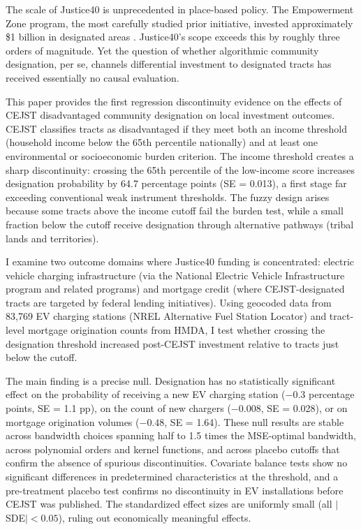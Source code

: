 \documentclass[12pt]{article}
\begin{document}
The scale of Justice40 is unprecedented in place-based policy. The Empowerment Zone program, the most carefully studied prior initiative, invested approximately \$1 billion in designated areas \citep{busso2013assessing}. Justice40's scope exceeds this by roughly three orders of magnitude. Yet the question of whether algorithmic community designation, per se, channels differential investment to designated tracts has received essentially no causal evaluation.

This paper provides the first regression discontinuity evidence on the effects of CEJST disadvantaged community designation on local investment outcomes. CEJST classifies tracts as disadvantaged if they meet both an income threshold (household income below the 65th percentile nationally) and at least one environmental or socioeconomic burden criterion. The income threshold creates a sharp discontinuity: crossing the 65th percentile of the low-income score increases designation probability by 64.7 percentage points (SE = 0.013), a first stage far exceeding conventional weak instrument thresholds. The fuzzy design arises because some tracts above the income cutoff fail the burden test, while a small fraction below the cutoff receive designation through alternative pathways (tribal lands and territories).

I examine two outcome domains where Justice40 funding is concentrated: electric vehicle charging infrastructure (via the National Electric Vehicle Infrastructure program and related programs) and mortgage credit (where CEJST-designated tracts are targeted by federal lending initiatives). Using geocoded data from 83,769 EV charging stations (NREL Alternative Fuel Station Locator) and tract-level mortgage origination counts from HMDA, I test whether crossing the designation threshold increased post-CEJST investment relative to tracts just below the cutoff.

The main finding is a precise null. Designation has no statistically significant effect on the probability of receiving a new EV charging station ($-0.3$ percentage points, SE = 1.1 pp), on the count of new chargers ($-0.008$, SE = 0.028), or on mortgage origination volumes ($-0.48$, SE = 1.64). These null results are stable across bandwidth choices spanning half to 1.5 times the MSE-optimal bandwidth, across polynomial orders and kernel functions, and across placebo cutoffs that confirm the absence of spurious discontinuities. Covariate balance tests show no significant differences in predetermined characteristics at the threshold, and a pre-treatment placebo test confirms no discontinuity in EV installations before CEJST was published. The standardized effect sizes are uniformly small (all $|$SDE$|<0.05$), ruling out economically meaningful effects.
\end{document}
